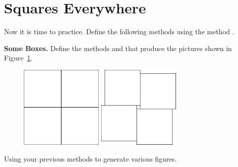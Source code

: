 
\section{Squares Everywhere}
Now it is time to practice. Define the following methods using the method .


\begin{exonofig}{\textbf{Some Boxes.}}
Define the methods  and  that produce the 
pictures shown in Figure~\ref{c7groscarre}.
\end{exonofig}

\begin{figure}[h]
\begin{minipage}[c]{.30\linewidth}
\centerline{\includegraphics[width=4cm]{comp4Squares}}
\end{minipage}
\hfill
\begin{minipage}[c]{.30\linewidth}
\centerline{\includegraphics[width=4cm]{comp4SquaresTwo}}
\end{minipage}
\label{c7groscarre}
\end{figure}
 


\begin{exonofig}
Using your previous methods to generate various figures.
\end{exonofig}


